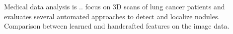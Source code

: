 \documentclass[main.tex]{subfiles}
\begin{document}
Medical data analysis is .. focus on 3D scans of lung cancer patients and evaluates several automated approaches to detect and localize nodules. Comparison between learned and handcrafted features on the image data.
\end{document}
